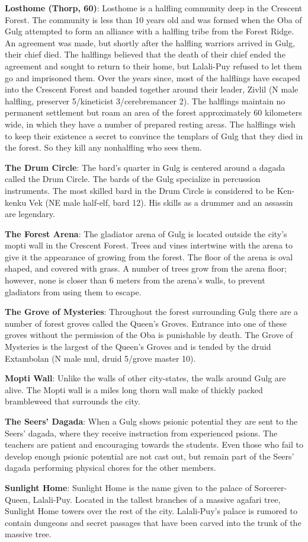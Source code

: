 {
	\textbf{Losthome (Thorp, 60)}: Losthome is a halfling community deep in the Crescent Forest. The community is less than 10 years old and was formed when the Oba of Gulg attempted to form an alliance with a halfling tribe from the Forest Ridge. An agreement was made, but shortly after the halfling warriors arrived in Gulg, their chief died. The halflings believed that the death of their chief ended the agreement and sought to return to their home, but Lalali-Puy refused to let them go and imprisoned them. Over the years since, most of the halflings have escaped into the Crescent Forest and banded together around their leader, Zivlil (N male halfling, preserver 5/kineticist 3/cerebremancer 2). The halflings maintain no permanent settlement but roam an area of the forest approximately 60 kilometers wide, in which they have a number of prepared resting areas. The halflings wish to keep their existence a secret to convince the templars of Gulg that they died in the forest. So they kill any nonhalfling who sees them.
}
{
	\textbf{The Drum Circle}: The bard's quarter in Gulg is centered around a dagada called the Drum Circle. The bards of the Gulg specialize in percussion instruments. The most skilled bard in the Drum Circle is considered to be Ken-kenku Vek (NE male half-elf, bard 12). His skills as a drummer and an assassin are legendary.

	\textbf{The Forest Arena}: The gladiator arena of Gulg is located outside the city's mopti wall in the Crescent Forest. Trees and vines intertwine with the arena to give it the appearance of growing from the forest. The floor of the arena is oval shaped, and covered with grass. A number of trees grow from the arena floor; however, none is closer than 6 meters from the arena's walls, to prevent gladiators from using them to escape.

	\textbf{The Grove of Mysteries}: Throughout the forest surrounding Gulg there are a number of forest groves called the Queen's Groves. Entrance into one of these groves without the permission of the Oba is punishable by death. The Grove of Mysteries is the largest of the Queen's Groves and is tended by the druid Extambolan (N male mul, druid 5/grove master 10).

	\textbf{Mopti Wall}: Unlike the walls of other city-states, the walls around Gulg are alive. The Mopti wall is a miles long thorn wall make of thickly packed brambleweed that surrounds the city.

	\textbf{The Seers' Dagada}: When a Gulg shows psionic potential they are sent to the Seers' dagada, where they receive instruction from experienced psions. The teachers are patient and encouraging towards the students. Even those who fail to develop enough psionic potential are not cast out, but remain part of the Seers' dagada performing physical chores for the other members.

	\textbf{Sunlight Home}: Sunlight Home is the name given to the palace of Sorcerer-Queen, Lalali-Puy. Located in the tallest branches of a massive agafari tree, Sunlight Home towers over the rest of the city. Lalali-Puy's palace is rumored to contain dungeons and secret passages that have been carved into the trunk of the massive tree.
}
